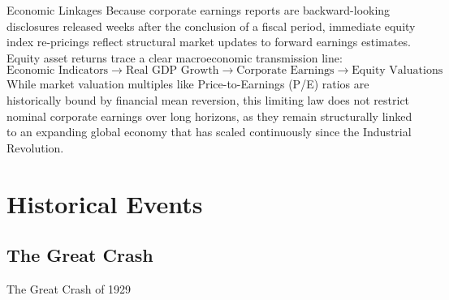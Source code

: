 \documentclass[10pt]{article}
\begin{document}
    \begin{core}{Economic Linkages}
      Because corporate earnings reports are backward-looking disclosures released weeks after the conclusion of a fiscal period, immediate equity index re-pricings reflect structural market updates to forward earnings estimates. Equity asset returns trace a clear macroeconomic transmission line:
      $$\text{Economic Indicators} \longrightarrow \text{Real GDP Growth} \longrightarrow \text{Corporate Earnings} \longrightarrow \text{Equity Valuations}$$
      While market valuation multiples like Price-to-Earnings (P/E) ratios are historically bound by financial mean reversion, this limiting law does not restrict nominal corporate earnings over long horizons, as they remain structurally linked to an expanding global economy that has scaled continuously since the Industrial Revolution.
    \end{core}

\section{Historical Events}

  \subsection{The Great Crash}

    \begin{core}{The Great Crash of 1929}


    \end{core}
\end{document}
